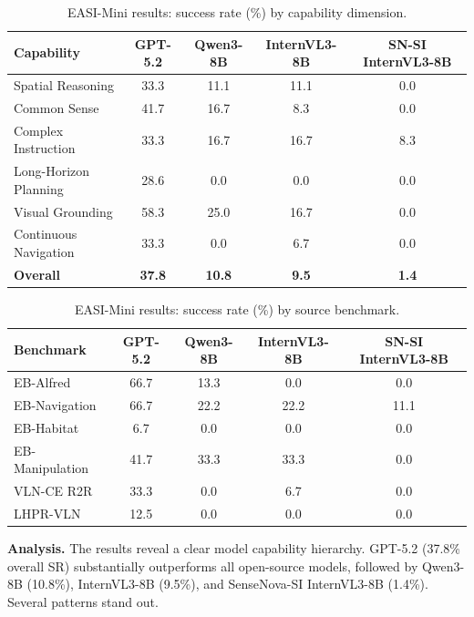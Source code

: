 \begin{table}[htbp]
\centering
\caption{EASI-Mini results: success rate (\%) by capability dimension.}
\label{tab:easimini_capability}
\renewcommand{\arraystretch}{1.1}
\begin{tabular}{lcccc}
\toprule
\textbf{Capability} & \textbf{GPT-5.2} & \textbf{Qwen3-8B} & \textbf{InternVL3-8B} & \textbf{SN-SI InternVL3-8B} \\
\midrule
Spatial Reasoning & 33.3 & 11.1 & 11.1 & 0.0 \\
Common Sense & 41.7 & 16.7 & 8.3 & 0.0 \\
Complex Instruction & 33.3 & 16.7 & 16.7 & 8.3 \\
Long-Horizon Planning & 28.6 & 0.0 & 0.0 & 0.0 \\
Visual Grounding & 58.3 & 25.0 & 16.7 & 0.0 \\
Continuous Navigation & 33.3 & 0.0 & 6.7 & 0.0 \\
\midrule
\textbf{Overall} & \textbf{37.8} & \textbf{10.8} & \textbf{9.5} & \textbf{1.4} \\
\bottomrule
\end{tabular}
\end{table}

\begin{table}[htbp]
\centering
\caption{EASI-Mini results: success rate (\%) by source benchmark.}
\label{tab:easimini_benchmark}
\renewcommand{\arraystretch}{1.1}
\begin{tabular}{lcccc}
\toprule
\textbf{Benchmark} & \textbf{GPT-5.2} & \textbf{Qwen3-8B} & \textbf{InternVL3-8B} & \textbf{SN-SI InternVL3-8B} \\
\midrule
EB-Alfred & 66.7 & 13.3 & 0.0 & 0.0 \\
EB-Navigation & 66.7 & 22.2 & 22.2 & 11.1 \\
EB-Habitat & 6.7 & 0.0 & 0.0 & 0.0 \\
EB-Manipulation & 41.7 & 33.3 & 33.3 & 0.0 \\
VLN-CE R2R & 33.3 & 0.0 & 6.7 & 0.0 \\
LHPR-VLN & 12.5 & 0.0 & 0.0 & 0.0 \\
\bottomrule
\end{tabular}
\end{table}


\textbf{Analysis.} The results reveal a clear model capability hierarchy. GPT-5.2 (37.8\% overall SR) substantially outperforms all open-source models, followed by Qwen3-8B (10.8\%), InternVL3-8B (9.5\%), and SenseNova-SI InternVL3-8B (1.4\%). Several patterns stand out.

